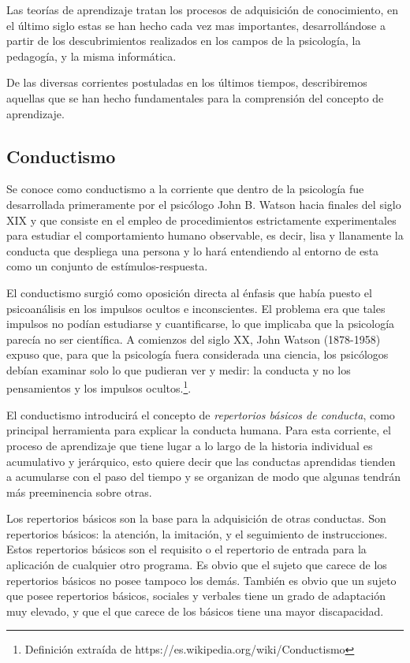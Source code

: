 Las teorías de aprendizaje tratan los procesos de adquisición de conocimiento,
en el último siglo estas se han hecho cada vez mas importantes, desarrollándose
a partir de los descubrimientos realizados en los campos de la psicología, la
pedagogía, y la misma informática.

De las diversas corrientes postuladas en los últimos tiempos, describiremos
aquellas que se han hecho fundamentales para la comprensión del concepto de
aprendizaje.

\subsection{Conductismo}

Se conoce como conductismo a la corriente que dentro de la psicología fue
desarrollada primeramente por el psicólogo John B. Watson hacia finales del
siglo XIX y que consiste en el empleo de procedimientos estrictamente
experimentales para estudiar el comportamiento humano observable, es decir,
lisa y llanamente la conducta que despliega una persona y lo hará entendiendo
al entorno de esta como un conjunto de estímulos-respuesta.\cite{ABC}

El conductismo surgió como oposición directa al énfasis que había puesto el
psicoanálisis en los impulsos ocultos e inconscientes. El problema era que tales
impulsos no podían estudiarse y cuantificarse, lo que implicaba que la
psicología parecía no ser científica. A comienzos del siglo XX, John Watson
(1878-1958) expuso que, para que la psicología fuera considerada una ciencia,
los psicólogos debían examinar solo lo que pudieran ver y medir: la conducta y
no los pensamientos y los impulsos ocultos.\footnote{Definición extraída de
https://es.wikipedia.org/wiki/Conductismo}.

El conductismo introducirá el concepto de \emph{repertorios básicos de
conducta}, como principal herramienta para explicar la conducta humana. Para
esta corriente, el proceso de aprendizaje que tiene lugar a lo largo de la
historia individual es acumulativo y jerárquico, esto quiere decir que las
conductas aprendidas tienden a acumularse con el paso del tiempo y se organizan
de modo que algunas tendrán más preeminencia sobre otras.

Los repertorios básicos son la base para la adquisición de otras conductas. Son
repertorios básicos: la atención, la imitación, y el seguimiento de
instrucciones. Estos repertorios básicos son el requisito o el repertorio de
entrada para la aplicación de cualquier otro programa. Es obvio que el sujeto
que carece de los repertorios básicos no posee tampoco los demás. También es
obvio que un sujeto que posee repertorios básicos, sociales y verbales tiene un
grado de adaptación muy elevado, y que el que carece de los básicos tiene una
mayor discapacidad.\cite{Glez}

